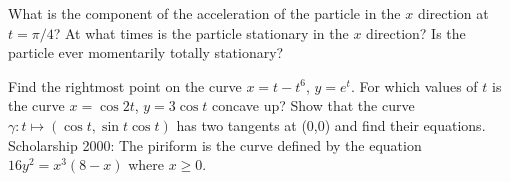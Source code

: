 \begin{questions}
            \begin{parts}
              \parA What is the component of the acceleration of the particle in the $ x $ direction at $ t = \pi/4 $?
              \parA At what times is the particle stationary in the $ x $ direction?
              \parM Is the particle ever momentarily totally stationary?
            \end{parts}
  \questioE Find the rightmost point on the curve $ x = t - t^6 $, $ y = e^t $.
  \questioE For which values of $ t $ is the curve $ x = \cos 2t $, $ y = 3\cos t $ concave up?
  \questioS Show that the curve $ \gamma : t \mapsto (\cos t, \sin t \cos t) $ has two tangents at (0,0)
            and find their equations.
  \questioS Scholarship 2000: The piriform is the curve defined by the equation $ 16y^2 = x^3(8-x) $ where $ x \geq 0 $.
\end{questions}

